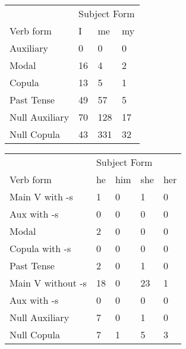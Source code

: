 \begin{table}[]
\begin{minipage}{0.5\textwidth}
    \centering
    \begin{tabular}{@{}llll@{}}
        \toprule
            &\multicolumn{3}{l}{Subject Form}\\
            \cline{2-4}
        Verb form & I & me & my \\
        \midrule
        Auxiliary & 0 & 0 & 0 \\
        Modal & 16 & 4 & 2 \\
        Copula & 13 & 5 & 1 \\
        Past Tense & 49 & 57 & 5 \\
        \hline
        Null Auxiliary & 70 & 128 & 17 \\
        Null Copula & 43 & 331 & 32 \\
        \bottomrule
    \end{tabular}
\end{minipage}
\begin{minipage}{0.5\textwidth}
    \centering
    \begin{tabular}{@{}lllll@{}}
        \toprule
            &\multicolumn{4}{l}{Subject Form}\\
            \cline{2-5}
        Verb form & he & him & she & her \\
        \midrule
        Main V with -s & 1 & 0 & 1 & 0 \\
        Aux with -s & 0 & 0 & 0 & 0 \\
        Modal & 2 & 0 & 0 & 0 \\
        Copula with -s & 0 & 0 & 0 & 0 \\
        Past Tense & 2 & 0 & 1 & 0 \\
        \hline
        Main V without -s & 18 & 0 & 23 & 1 \\
        Aux with -s & 0 & 0 & 0 & 0 \\
        Null Auxiliary & 7 & 0 & 1 & 0 \\
        Null Copula & 7 & 1 & 5 & 3 \\
        \bottomrule
    \end{tabular}
    \end{minipage}
\end{table}
